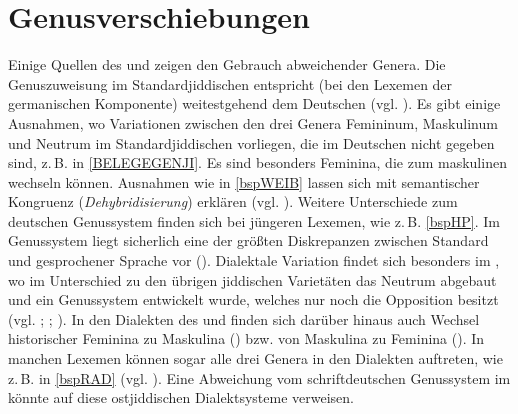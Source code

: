  \section{Genusverschiebungen}\label{genus}
 Einige Quellen des  und  zeigen den Gebrauch abweichender Genera. Die Genuszuweisung im Standardjiddischen entspricht (bei den Lexemen der germanischen Komponente) weitestgehend dem Deutschen (vgl. \cite[166–168]{Jacobs2005}). Es gibt einige Ausnahmen, wo Variationen zwischen den drei Genera Femininum, Maskulinum und Neutrum im Standardjiddischen vorliegen, die im Deutschen nicht gegeben sind, z.\,B. in \ref{BELEGEGENJI}. Es sind besonders Feminina, die zum maskulinen  wechseln können. Ausnahmen wie in \ref{bspWEIB} lassen sich mit semantischer Kongruenz (\textit{Dehybridisierung}) erklären (vgl. \cite{Fleischer2012}). Weitere Unterschiede zum deutschen Genussystem finden sich bei jüngeren Lexemen, wie z.\,B. \ref{bspHP}. Im Genussystem liegt sicherlich eine der größten Diskrepanzen zwischen Standard und gesprochener Sprache vor (\cite[insbes. 153–207]{Wolf1969}). \label{GENUSNOJ}Dialektale Variation findet sich besonders im , wo im Unterschied zu den übrigen jiddischen Varietäten das Neutrum abgebaut und ein Genussystem entwickelt wurde, welches nur noch die Opposition  besitzt (vgl. \cite{Jacobs1990b}; \cite{Wolf1969}; \cite[101–124]{Herzog1965}). In den Dialekten des  und  finden sich darüber hinaus auch Wechsel historischer Feminina zu Maskulina (\cite[160–168]{Wolf1969}) bzw. von Maskulina zu Feminina (\cite[168–176]{Wolf1969}). In manchen Lexemen können sogar alle drei Genera in den Dialekten auftreten, wie z.\,B. in \ref{bspRAD}  (vgl. \cite[178]{Wolf1969}). Eine Abweichung vom schriftdeutschen Genussystem im  könnte auf diese ostjiddischen Dialektsysteme verweisen. \\
 
 
